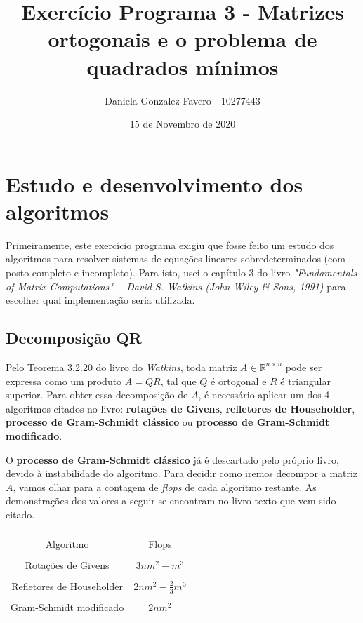 \documentclass[a4paper,11pt]{article}
\title{Exercício Programa 3 - Matrizes ortogonais e o problema de quadrados mínimos}
\author{
  Daniela Gonzalez Favero - 10277443
}
\date{15 de Novembro de 2020}
\begin{document}
\maketitle

\section{Estudo e desenvolvimento dos algoritmos}
    Primeiramente, este exercício programa exigiu que fosse feito um estudo dos algoritmos para resolver sistemas de equações lineares sobredeterminados (com posto completo e incompleto). Para isto, usei o capítulo 3 do livro \textit{"Fundamentals of Matrix Computations"\ – David S. Watkins (John Wiley \& Sons, 1991)} para escolher qual implementação seria utilizada.
    
    \subsection{Decomposição QR}
        Pelo Teorema 3.2.20 do livro do \textit{Watkins}, toda matriz $A \in \mathbb{R}^{n \times n}$ pode ser expressa como um produto $A=QR$, tal que $Q$ é ortogonal e $R$ é triangular superior. Para obter essa decomposição de $A$, é necessário aplicar um dos 4 algoritmos citados no livro: \textbf{rotações de Givens}, \textbf{refletores de Householder}, \textbf{processo de Gram-Schmidt clássico} ou \textbf{processo de Gram-Schmidt modificado}.
        
        O \textbf{processo de Gram-Schmidt clássico} já é descartado pelo próprio livro, devido à instabilidade do algoritmo. Para decidir como iremos decompor a matriz $A$, vamos olhar para a contagem de \textit{flops} de cada algoritmo restante. As demonstrações dos valores a seguir se encontram no livro texto que vem sido citado.
        \begin{center}
            \begin{tabular}{ | c | c |} 
                \hline
                & \\ [-1em]
                Algoritmo & Flops\\  [+.5em]
                \hline\hline
                & \\ [-1em]
                Rotações de Givens & $3nm^2-m^3$\\ [+.5em]
                \hline
                & \\ [-1em]
                Refletores de Householder & $2nm^2-\frac{2}{3}m^3$\\ [+.5em]
                \hline
                &\\ [-1em]
                Gram-Schmidt modificado & $2nm^2$\\ [+.5em]
                \hline
            \end{tabular}
        \end{center}
        
\end{document}
